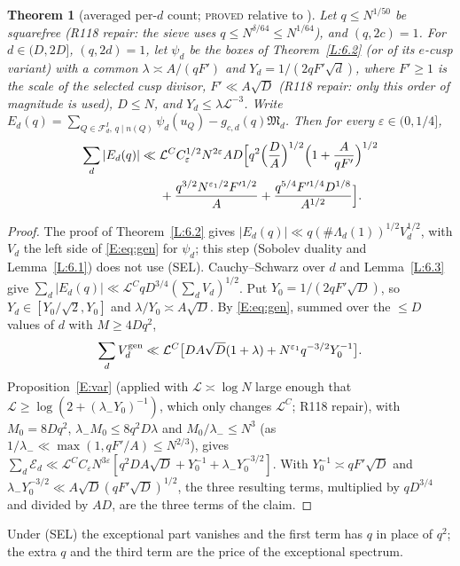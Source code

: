 \documentclass[10pt,reqno]{amsart}
\newtheorem{theorem}{Theorem}[section]
\theoremstyle{definition}
\numberwithin{equation}{section}
\newcommand{\cL}{\mathcal L}
\newcommand{\cF}{\mathcal F}
\newcommand{\status}[1]{\textup{\textsc{#1}}}
\begin{document}
\begin{theorem}[averaged per-$d$ count; \status{proved} relative to \cite{DI,Dr}]\label{E:perd}
Let $q\le N^{1/50}$ be squarefree (R118 repair: the sieve uses $q\le N^{\delta/64}\le N^{1/64}$), and $(q,2c)=1$. For $d\in(D,2D]$,
$(q,2d)=1$, let $\psi_d$ be the boxes of Theorem~\ref{L:6.2} (or of its
$e$-cusp variant) with a common
$\lambda\asymp A/(qF')$ and $Y_d=1/(2qF'\sqrt d)$, where $F'\ge1$ is the
scale of the selected cusp divisor, $F'\ll A\sqrt D$ (R118 repair: only this order of magnitude is used), $D\le N$, and
$Y_d\le\lambda\cL^{-3}$. Write
$E_d(q)=\sum_{Q\in\cF_d^I,\,q\mid n(Q)}\psi_d(u_Q)-g_{c,d}(q)\mathfrak M_d$.
Then for every $\varepsilon\in(0,1/4]$,
\[
 \begin{aligned}
 \sum_{d}|E_d(q)|\ll{}&\cL^CC_\varepsilon^{1/2}N^{2\varepsilon}AD
 \Bigl[q^2\Bigl(\frac DA\Bigr)^{1/2}\Bigl(1+\frac A{qF'}\Bigr)^{1/2}
 \\&+\frac{q^{3/2}N^{\varepsilon_1/2}F'^{1/2}}A
 +\frac{q^{5/4}F'^{1/4}D^{1/8}}{A^{1/2}}\Bigr].
 \end{aligned}
\]
\end{theorem}
\begin{proof}
The proof of Theorem~\ref{L:6.2} gives
$|E_d(q)|\ll q(\#\Lambda_d(1))^{1/2}V_d^{1/2}$, with $V_d$ the left side of
\eqref{E:eq:gen} for $\psi_d$; this step (Sobolev duality and
Lemma~\ref{L:6.1}) does not use (SEL). Cauchy--Schwarz over $d$ and
Lemma~\ref{L:6.3} give
$\sum_d|E_d(q)|\ll\cL^CqD^{3/4}(\sum_dV_d)^{1/2}$. Put
$Y_0=1/(2qF'\sqrt D)$, so $Y_d\in[Y_0/\sqrt2,Y_0]$ and $\lambda/Y_0\asymp A\sqrt D$.
By \eqref{E:eq:gen}, summed over the $\le D$ values of $d$ with $M\ge4Dq^2$,
\[
 \sum_dV_d^{\rm gen}\ll\cL^C\bigl[DA\sqrt D(1+\lambda)
 +N^{\varepsilon_1}q^{-3/2}Y_0^{-1}\bigr].
\]
Proposition~\ref{E:var} (applied with $\cL\asymp\log N$ large enough that $\cL\ge\log(2+(\lambda_-Y_0)^{-1})$, which only changes $\cL^C$; R118 repair), with $M_0=8Dq^2$, $\lambda_-M_0\le8q^2D\lambda$ and
$M_0/\lambda_-\le N^3$ (as $1/\lambda_-\ll\max(1,qF'/A)\le N^{2/3}$), gives
$\sum_d\mathcal E_d\ll\cL^CC_\varepsilon N^{3\varepsilon}
[q^2DA\sqrt D+Y_0^{-1}+\lambda_-Y_0^{-3/2}]$. With
$Y_0^{-1}\asymp qF'\sqrt D$ and $\lambda_-Y_0^{-3/2}\ll A\sqrt D(qF'\sqrt D)^{1/2}$,
the three resulting terms, multiplied by $qD^{3/4}$ and divided by $AD$,
are the three terms of the claim.
\end{proof}
Under (SEL) the exceptional part vanishes and the first term has $q$ in
place of $q^2$; the extra $q$ and the third term are the price of the
exceptional spectrum.
\end{document}

